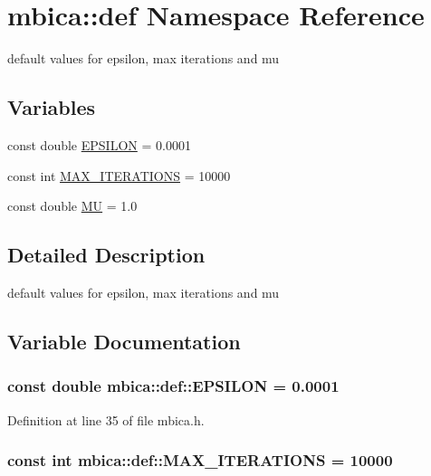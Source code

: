 \hypertarget{namespacembica_1_1def}{
\section{mbica::def Namespace Reference}
\label{namespacembica_1_1def}
}


default values for epsilon, max iterations and mu  


\subsection*{Variables}
\begin{DoxyCompactItemize}
\item 
const double \hyperlink{namespacembica_1_1def_a7616a07084967bcb2533a310e68de6b5}{EPSILON} = 0.0001
\item 
const int \hyperlink{namespacembica_1_1def_ab5cf75974e06b7a429e0abefa5e2d3c8}{MAX\_\-ITERATIONS} = 10000
\item 
const double \hyperlink{namespacembica_1_1def_a060dcd264ce55c7a950c066dcf7d0a34}{MU} = 1.0
\end{DoxyCompactItemize}


\subsection{Detailed Description}
default values for epsilon, max iterations and mu 

\subsection{Variable Documentation}
\hypertarget{namespacembica_1_1def_a7616a07084967bcb2533a310e68de6b5}{
\subsubsection[{EPSILON}]{\setlength{\rightskip}{0pt plus 5cm}const double {\bf mbica::def::EPSILON} = 0.0001}}
\label{namespacembica_1_1def_a7616a07084967bcb2533a310e68de6b5}


Definition at line 35 of file mbica.h.

\hypertarget{namespacembica_1_1def_ab5cf75974e06b7a429e0abefa5e2d3c8}{
\subsubsection[{MAX\_\-ITERATIONS}]{\setlength{\rightskip}{0pt plus 5cm}const int {\bf mbica::def::MAX\_\-ITERATIONS} = 10000}}
\label{namespacembica_1_1def_ab5cf75974e06b7a429e0abefa5e2d3c8}


